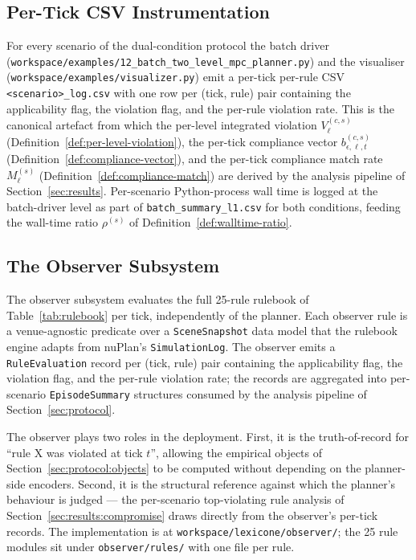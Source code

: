 \subsection{Per-Tick CSV Instrumentation}
\label{sec:deployment:instrumentation}

For every scenario of the dual-condition protocol the batch driver (\texttt{workspace/examples/12\_batch\_two\_level\_mpc\_planner.py}) and the visualiser (\texttt{workspace/examples/visualizer.py}) emit a per-tick per-rule CSV \texttt{<scenario>\_log.csv} with one row per (tick, rule) pair containing the applicability flag, the violation flag, and the per-rule violation rate. This is the canonical artefact from which the per-level integrated violation $V_\ell^{(c,s)}$ (Definition~\ref{def:per-level-violation}), the per-tick compliance vector $b_{\epsilon,\ell,t}^{(c,s)}$ (Definition~\ref{def:compliance-vector}), and the per-tick compliance match rate $M_\ell^{(s)}$ (Definition~\ref{def:compliance-match}) are derived by the analysis pipeline of Section~\ref{sec:results}. Per-scenario Python-process wall time is logged at the batch-driver level as part of \texttt{batch\_summary\_l1.csv} for both conditions, feeding the wall-time ratio $\rho^{(s)}$ of Definition~\ref{def:walltime-ratio}.

\subsection{The Observer Subsystem}
\label{sec:deployment:observer}

The observer subsystem evaluates the full 25-rule rulebook of Table~\ref{tab:rulebook} per tick, independently of the planner. Each observer rule is a venue-agnostic predicate over a \texttt{SceneSnapshot} data model that the rulebook engine adapts from nuPlan's \texttt{SimulationLog}. The observer emits a \texttt{RuleEvaluation} record per (tick, rule) pair containing the applicability flag, the violation flag, and the per-rule violation rate; the records are aggregated into per-scenario \texttt{EpisodeSummary} structures consumed by the analysis pipeline of Section~\ref{sec:protocol}.

The observer plays two roles in the deployment. First, it is the truth-of-record for ``rule X was violated at tick $t$'', allowing the empirical objects of Section~\ref{sec:protocol:objects} to be computed without depending on the planner-side encoders. Second, it is the structural reference against which the planner's behaviour is judged --- the per-scenario top-violating rule analysis of Section~\ref{sec:results:compromise} draws directly from the observer's per-tick records. The implementation is at \texttt{workspace/lexicone/observer/}; the 25 rule modules sit under \texttt{observer/rules/} with one file per rule.
